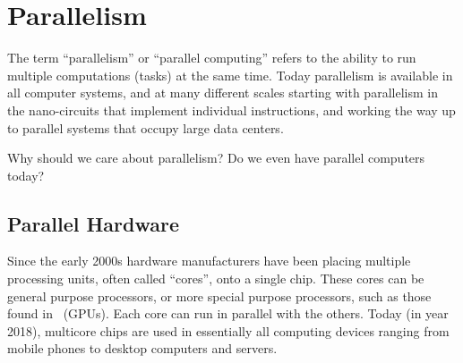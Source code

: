 \chapter{Parallelism}
\label{ch:introduction::parallelism}

\begin{cluster}
\label{grp:grm:introduction::parallelism::term}

\begin{gram}
\label{grm:introduction::parallelism::term}
The term ``parallelism'' or ``parallel computing'' refers to the ability to run multiple computations (tasks) at the same time.
Today parallelism is available in all computer systems, and at many different scales starting with parallelism in the nano-circuits that implement individual instructions, and working the way up to parallel systems that occupy large data centers.  

\end{gram}
\end{cluster}

\begin{cluster}
\label{grp:tch:introduction::parallelism::care}

\begin{teachask}
\label{tch:introduction::parallelism::care}
Why should we care about parallelism?  
Do we even have parallel computers today? 

\end{teachask}
\end{cluster}


\section{Parallel Hardware}
\label{sec:introduction::parallelism::parallel-hardware}

\begin{cluster}
\label{grp:grm:introduction::parallelism::multicore-chips}

\begin{gram}
\label{grm:introduction::parallelism::multicore-chips}
Since the early 2000s
hardware manufacturers have been placing multiple processing units,
often called ``cores'', onto a single chip.  These cores can be
general purpose processors, or more special purpose processors, such as
those found in~ (GPUs).  
Each core can run in parallel with the others.
Today (in year 2018), multicore chips are used in essentially all
computing devices ranging from mobile phones to desktop computers and
servers.

\end{gram}
\end{cluster}

